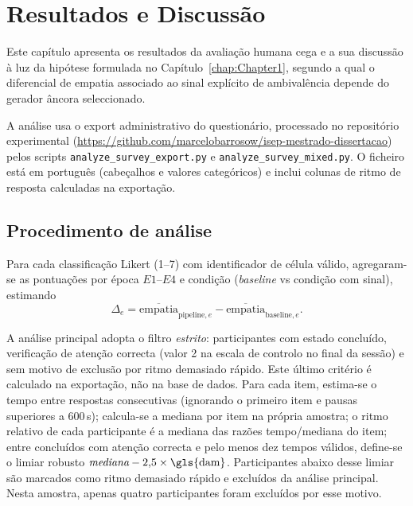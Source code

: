 
\chapter{Resultados e Discussão}
\label{chap:Chapter5}

Este capítulo apresenta os resultados da avaliação humana cega e a sua discussão à luz da hipótese formulada no Capítulo~\ref{chap:Chapter1}, segundo a qual o diferencial de empatia associado ao sinal explícito de ambivalência depende do gerador âncora seleccionado.

A análise usa o export administrativo do questionário, processado no repositório experimental (\url{https://github.com/marcelobarrosow/isep-mestrado-dissertacao}) pelos scripts \texttt{analyze\_survey\_export.py} e \texttt{analyze\_survey\_mixed.py}. O ficheiro está em português (cabeçalhos e valores categóricos) e inclui colunas de ritmo de resposta calculadas na exportação.


\section{Procedimento de análise}
\label{sec:res_procedimento}

Para cada classificação Likert (1--7) com identificador de célula válido, agregaram-se as pontuações por época \(E1\)--\(E4\) e condição (\textit{baseline} vs condição com sinal), estimando
\[
\Delta_e = \overline{\text{empatia}}_{\text{pipeline},e} - \overline{\text{empatia}}_{\text{baseline},e}.
\]

A análise principal adopta o filtro \textit{estrito}: participantes com estado concluído, verificação de atenção correcta (valor 2 na escala de controlo no final da sessão) e sem motivo de exclusão por ritmo demasiado rápido. Este último critério é calculado na exportação, não na base de dados. Para cada item, estima-se o tempo entre respostas consecutivas (ignorando o primeiro item e pausas superiores a 600\,s); calcula-se a mediana por item na própria amostra; o ritmo relativo de cada participante é a mediana das razões tempo/mediana do item; entre concluídos com atenção correcta e pelo menos dez tempos válidos, define-se o limiar robusto \(\textit{mediana} - 2{,}5 \times \text{\gls{dam}}\). Participantes abaixo desse limiar são marcados como ritmo demasiado rápido e excluídos da análise principal. Nesta amostra, apenas quatro participantes foram excluídos por esse motivo.

